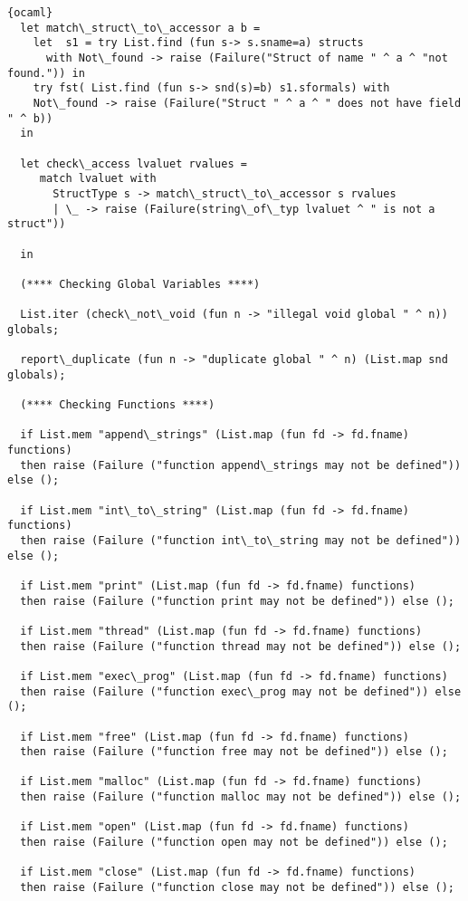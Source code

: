 \begin{lstlisting}{ocaml}
  let match\_struct\_to\_accessor a b = 
    let  s1 = try List.find (fun s-> s.sname=a) structs 
      with Not\_found -> raise (Failure("Struct of name " ^ a ^ "not found.")) in
    try fst( List.find (fun s-> snd(s)=b) s1.sformals) with
	Not\_found -> raise (Failure("Struct " ^ a ^ " does not have field " ^ b))
  in

  let check\_access lvaluet rvalues =
     match lvaluet with
       StructType s -> match\_struct\_to\_accessor s rvalues
       | \_ -> raise (Failure(string\_of\_typ lvaluet ^ " is not a struct"))
	
  in

  (**** Checking Global Variables ****)

  List.iter (check\_not\_void (fun n -> "illegal void global " ^ n)) globals;
   
  report\_duplicate (fun n -> "duplicate global " ^ n) (List.map snd globals);

  (**** Checking Functions ****)

  if List.mem "append\_strings" (List.map (fun fd -> fd.fname) functions)
  then raise (Failure ("function append\_strings may not be defined")) else ();

  if List.mem "int\_to\_string" (List.map (fun fd -> fd.fname) functions)
  then raise (Failure ("function int\_to\_string may not be defined")) else ();

  if List.mem "print" (List.map (fun fd -> fd.fname) functions)
  then raise (Failure ("function print may not be defined")) else ();

  if List.mem "thread" (List.map (fun fd -> fd.fname) functions)
  then raise (Failure ("function thread may not be defined")) else ();

  if List.mem "exec\_prog" (List.map (fun fd -> fd.fname) functions)
  then raise (Failure ("function exec\_prog may not be defined")) else ();

  if List.mem "free" (List.map (fun fd -> fd.fname) functions)
  then raise (Failure ("function free may not be defined")) else ();

  if List.mem "malloc" (List.map (fun fd -> fd.fname) functions)
  then raise (Failure ("function malloc may not be defined")) else ();

  if List.mem "open" (List.map (fun fd -> fd.fname) functions)
  then raise (Failure ("function open may not be defined")) else ();

  if List.mem "close" (List.map (fun fd -> fd.fname) functions)
  then raise (Failure ("function close may not be defined")) else ();


\end{lstlisting}

